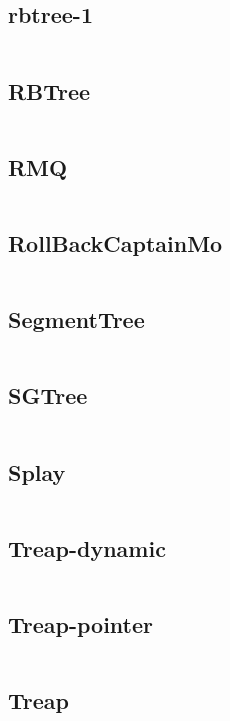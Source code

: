 \documentclass[a4]{article}
\begin{document}
\subsection{rbtree-1}
\inputminted[mathescape,linenos,numbersep=5pt,frame=lines,framesep=2mm]{cpp}{src/ds/rbtree-1.cpp}
\subsection{RBTree}
\inputminted[mathescape,linenos,numbersep=5pt,frame=lines,framesep=2mm]{cpp}{src/ds/RBTree.cpp}
\subsection{RMQ}
\inputminted[mathescape,linenos,numbersep=5pt,frame=lines,framesep=2mm]{cpp}{src/ds/RMQ.cpp}
\subsection{RollBackCaptainMo}
\inputminted[mathescape,linenos,numbersep=5pt,frame=lines,framesep=2mm]{cpp}{src/ds/RollBackCaptainMo.cpp}
\subsection{SegmentTree}
\inputminted[mathescape,linenos,numbersep=5pt,frame=lines,framesep=2mm]{cpp}{src/ds/SegmentTree.cpp}
\subsection{SGTree}
\inputminted[mathescape,linenos,numbersep=5pt,frame=lines,framesep=2mm]{cpp}{src/ds/SGTree.cpp}
\subsection{Splay}
\inputminted[mathescape,linenos,numbersep=5pt,frame=lines,framesep=2mm]{cpp}{src/ds/Splay.cpp}
\subsection{Treap-dynamic}
\inputminted[mathescape,linenos,numbersep=5pt,frame=lines,framesep=2mm]{cpp}{src/ds/Treap-dynamic.cpp}
\subsection{Treap-pointer}
\inputminted[mathescape,linenos,numbersep=5pt,frame=lines,framesep=2mm]{cpp}{src/ds/Treap-pointer.cpp}
\subsection{Treap}
\inputminted[mathescape,linenos,numbersep=5pt,frame=lines,framesep=2mm]{cpp}{src/ds/Treap.cpp}
\end{document}
